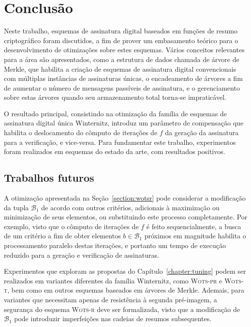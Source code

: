 \documentclass{ufsctex/ufsctex}
\newcommand{\wotsprf}{\textsc{Wots-pr}}
\newcommand{\wotst}{\textsc{Wots-t}}
\newcommand{\wotsr}{\textsc{Wots-r}}
\begin{document}
\chapter{Conclusão}\label{chapter:conclusion}

Neste trabalho, esquemas de assinatura digital baseados em funções de resumo
criptográfico foram discutidos, a fim de prover um embasamento teórico para o
desenvolvimento de otimizações sobre estes esquemas. Vários conceitos
relevantes para a área são apresentados, como a estrutura de dados chamada de
árvore de Merkle, que habilita a criação de esquemas de assinatura digital
convencionais com múltiplas instâncias de assinaturas únicas, o encadeamento de
árvores a fim de aumentar o número de mensagens passíveis de assinatura, e o
gerenciamento sobre estas árvores quando seu armazenamento total torna-se
impraticável.

O resultado principal, consistindo na otimização da família de esquemas de
assinatura digital única Winternitz, introduz um parâmetro de compensação que
habilita o deslocamento do cômputo de iterações de $f$ da geração da assinatura
para a verificação, e vice-versa. Para fundamentar este trabalho, experimentos
foram realizados em esquemas do estado da arte, com resultados positivos.

\section{Trabalhos futuros}\label{section:future}

A otimização apresentada na Seção~\ref{section:wotsr} pode considerar a
modificação da tupla $\mathcal{B}_1$ de acordo com outros critérios, adicionais
à maximização ou minimização de seus elementos, ou substituindo este processo
completamente. Por exemplo, visto que o cômputo de iterações de $f$ é feito
sequencialmente, a busca de um critério a fim de obter elementos $b \in
\mathcal{B}_1$ próximos em magnitude habilita o processamento paralelo destas
iterações, e portanto um tempo de execução reduzido para a geração e
verificação de assinaturas.

Experimentos que exploram as propostas do Capítulo~\ref{chapter:tuning} podem
ser realizados em variantes diferentes da família Winternitz, como \wotsprf{} e
\wotst{}, bem como em outros esquemas baseados em árvores de Merkle. Ademais,
para variantes que necessitam apenas de resistência à segunda pré-imagem, a
segurança do esquema \wotsr{} deve ser formalizada, visto que a modificação de
$\mathcal{B}_{1}$ pode introduzir imperfeições nas cadeias de resumos
subsequentes.



\end{document}
